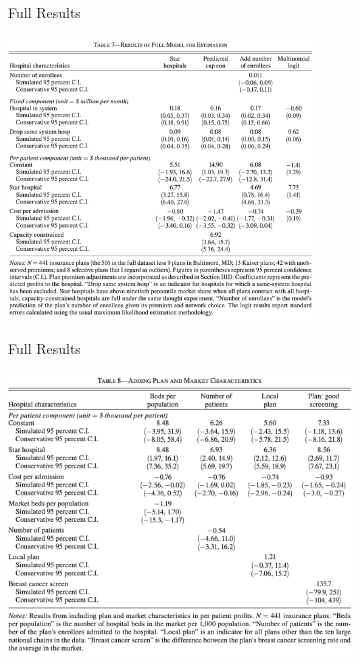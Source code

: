 \documentclass[xcolor=pdftex,dvipsnames,table,mathserif,aspectratio=169]{beamer}
\begin{document}
\begin{frame}{Full Results}
\begin{center}
\includegraphics[height=7.5cm]{./resources/ho_table7.png}
\end{center}
\end{frame}

\begin{frame}{Full Results}
\begin{center}
\includegraphics[height=7.5cm]{./resources/ho_table8.png}
\end{center}
\end{frame}
\end{document}
